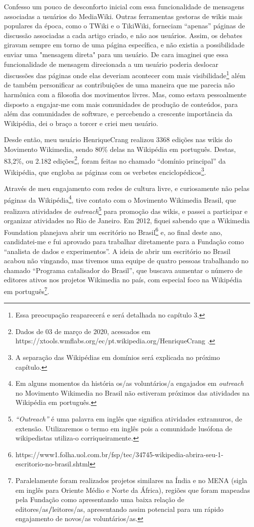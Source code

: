 Confesso um pouco de desconforto inicial com essa funcionalidade de mensagens associadas a usuários do MediaWiki. Outras ferramentas gestoras de wikis mais populares da época, como o TWiki e o TikiWiki, forneciam “apenas” páginas de discussão associadas a cada artigo criado, e não aos usuários. Assim, os debates giravam sempre em torno de uma página específica, e não existia a possibilidade enviar uma "mensagem direta" para um usuário. De cara imaginei que essa funcionalidade de mensagem direcionada a um usuário poderia deslocar discussões das páginas onde elas deveriam acontecer com mais visibilidade\footnote{Essa preocupação reaparecerá e será detalhada no capítulo 3.} além de também personificar as contribuições de uma maneira que me parecia não harmônica com a filosofia dos movimentos livres. Mas, como estava pessoalmente disposto a engajar-me com mais comunidades de produção de conteúdos, para além das comunidades de software, e percebendo a crescente importância da Wikipédia, dei o braço a torcer e criei meu usuário.

Desde então, meu usuário HenriqueCrang realizou 3368 edições nas wikis do Movimento Wikimedia, sendo 80\% delas na Wikipédia em português. Destas, 83,2\%, ou 2.182 edições\footnote{Dados de 03 de março de 2020, acessados em https://xtools.wmflabs.org/ec/pt.wikipedia.org/HenriqueCrang .}, foram feitas no chamado “domínio principal” da Wikipédia, que engloba as páginas com os verbetes enciclopédicos\footnote{A separação das Wikipédias em domínios será explicada no próximo capítulo.}.

Através de meu engajamento com redes de cultura livre, e curiosamente não pelas páginas da Wikipédia\footnote{Em alguns momentos da história os/as voluntários/a engajados em \textit{outreach} no Movimento Wikimedia no Brasil não estiveram próximos das atividades na Wikipédia em português.}, tive contato com o Movimento Wikimedia Brasil, que realizava atividades de \textit{outreach}\footnote{\textit{``Outreach''} é uma palavra em inglês que significa atividades extramuros, de extensão. Utilizaremos o termo em inglês pois a comunidade lusófona de wikipedistas utiliza-o corriqueiramente.} para promoção das wikis, e passei a participar e organizar atividades no Rio de Janeiro. Em 2012, fiquei sabendo que a Wikimedia Foundation planejava abrir um escritório no Brasil\footnote{https://www1.folha.uol.com.br/fsp/tec/34745-wikipedia-abrira-seu-1-escritorio-no-brasil.shtml} e, ao final deste ano, candidatei-me e fui aprovado para trabalhar diretamente para a Fundação como “analista de dados e experimentos”. A ideia de abrir um escritório no Brasil acabou não vingando, mas tivemos uma equipe de quatro pessoas trabalhando no chamado “Programa catalisador do Brasil”, que buscava aumentar o número de editores ativos nos projetos Wikimedia no país, com especial foco na Wikipédia em português\footnote{Paralelamente foram realizados projetos similares na Índia e no MENA (sigla em inglês para Oriente Médio e Norte da África), regiões que foram mapeadas pela Fundação como apresentando uma baixa relação de editores/as\textbf{/}leitores/as, apresentando assim potencial para um rápido engajamento de novos/as voluntários/as.}.

